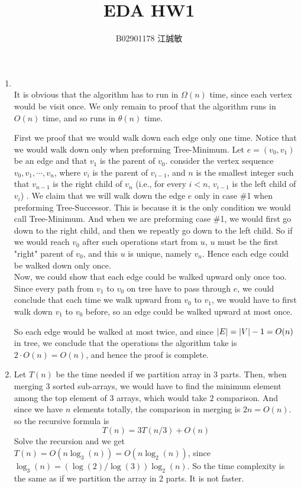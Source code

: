 \documentclass[12pt, a4paper]{article}
\title{EDA HW1}
\author{B02901178 江誠敏}
\DeclarePairedDelimiter{\abs}{\lvert}{\rvert}
\begin{document}
\maketitle
\begin{enumerate}[label=Prob.\arabic*]
  \item \\
    It is obvious that the algorithm has to run in $\Omega(n)$ time, 
    since each vertex would be visit once. We only remain to proof
    that the algorithm runs in $O(n)$ time, and so runs in $\theta(n)$
    time.

    First we proof that we would walk down each edge only one time.
    Notice that we would walk down only when preforming Tree-Minimum.
    Let $e = (v_0, v_1)$ be an edge and that $v_1$ is the parent of 
    $v_0$. consider the vertex sequence $v_0, v_1, \cdots, v_n$, 
    where $v_i$ is the parent of $v_{i-1}$, and $n$ is the smallest 
    integer such that $v_{n-1}$ is the right child of $v_n$ (i.e.,
    for every $i < n$, $v_{i-1}$ is the left child of $v_i$)
    . We claim that we will walk down the edge $e$ only in case \#1
    when preforming Tree-Successor. This is because it is the only
    condition we would call Tree-Minimum. And when we are preforming 
    case \#1, we would first go down to the right child, and then 
    we repeatly go down to the left child. So if we would reach $v_0$
    after such operations start from $u$, $u$ must be the first 
    "right" parent of $v_0$, and this $u$ is unique, namely $v_n$.
    Hence each edge could be walked down only once. \\
    Now, we could show that each edge could be walked upward only once
    too. Since every path from $v_1$ to $v_0$ on tree have to pass through
    $e$, we could conclude that each time we walk upward from $v_0$ to 
    $v_1$, we would have to first walk down $v_1$ to $v_0$ before, so
    an edge could be walked upward at most once.

    So each edge would be walked at most twice, and since $\abs{E} = \abs{V} - 1 = O(n)$
    in tree, we conclude that the operations the algorithm take is 
    $2 \cdot O(n) = O(n)$, and hence the proof is complete.

  \item Let $T(n)$ be the time needed if we partition array in 3 parts. Then,
    when merging 3 sorted sub-arrays, we would have to find the minimum element
    among the top element of 3 arrays, which would take $2$ comparison. And since
    we have $n$ elements totally, the comparison in merging is $2n = O(n)$.
    so the recursive formula is 
    \[ T(n) = 3T(n/3) + O(n) \]
    Solve the recursion and we get $T(n) = O(n \log_3(n)) = O(n \log_2(n))$, 
    since $\log_3(n) = (\log(2) / \log(3)) \log_2(n)$. So the time complexity 
    is the same as if we partition the array in 2 parts. It is not faster.


\end{enumerate}
\end{document}
